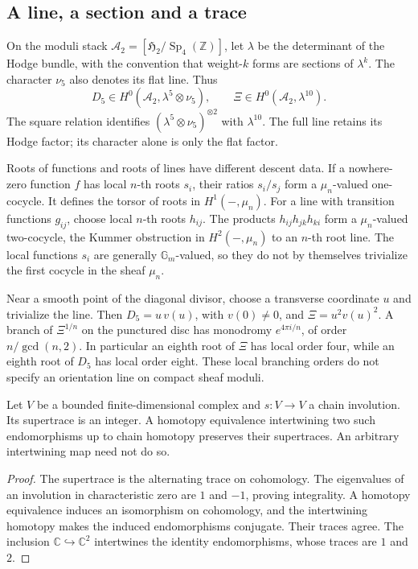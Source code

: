 \subsection{A line, a section and a trace}

On the moduli stack
\(\mathcal A_2=[\mathfrak H_2/\operatorname{Sp}_4(\mathbb Z)]\),
let \(\lambda\) be the determinant of the Hodge bundle,
with the convention that weight-\(k\) forms are sections
of \(\lambda^k\). The character \(\nu_5\) also denotes
its flat line. Thus
\begin{equation}\label{cyidx:eq:automorphic-line}
 D_5\in H^0(\mathcal A_2,\lambda^5\otimes\nu_5),
 \qquad
 \Xi\in H^0(\mathcal A_2,\lambda^{10}).
\end{equation}
The square relation identifies
\((\lambda^5\otimes\nu_5)^{\otimes2}\) with
\(\lambda^{10}\). The full line retains its Hodge
factor; its character alone is only the flat factor.

Roots of functions and roots of lines have different
descent data. If a nowhere-zero function \(f\) has local
\(n\)-th roots \(s_i\), their ratios \(s_i/s_j\)
form a \(\mu_n\)-valued one-cocycle. It defines the
torsor of roots in \(H^1(-,\mu_n)\).
For a line with transition functions \(g_{ij}\),
choose local \(n\)-th roots \(h_{ij}\).
The products \(h_{ij}h_{jk}h_{ki}\) form a
\(\mu_n\)-valued two-cocycle, the Kummer obstruction
in \(H^2(-,\mu_n)\) to an \(n\)-th root line.
The local functions \(s_i\) are generally
\(\mathbb G_m\)-valued, so they do not by themselves
trivialize the first cocycle in the sheaf \(\mu_n\).

Near a smooth point of the diagonal divisor, choose
a transverse coordinate \(u\) and trivialize the line.
Then \(D_5=u\,v(u)\), with \(v(0)\ne0\), and
\(\Xi=u^2v(u)^2\). A branch of \(\Xi^{1/n}\)
on the punctured disc has monodromy \(e^{4\pi i/n}\),
of order \(n/\gcd(n,2)\). In particular an eighth
root of \(\Xi\) has local order four, while an
eighth root of \(D_5\) has local order eight.
These local branching orders do not specify an
orientation line on compact sheaf moduli.

\begin{proposition}\label{cyidx:prop:trace}
Let \(V\) be a bounded finite-dimensional complex and
\(s:V\to V\) a chain involution. Its supertrace is an
integer. A homotopy equivalence intertwining two such
endomorphisms up to chain homotopy preserves their
supertraces. An arbitrary intertwining map need not do so.
\end{proposition}
\begin{proof}
The supertrace is the alternating trace on cohomology.
The eigenvalues of an involution in characteristic zero
are \(1\) and \(-1\), proving integrality.
A homotopy equivalence induces an isomorphism on cohomology,
and the intertwining homotopy makes the induced
endomorphisms conjugate. Their traces agree.
The inclusion \(\mathbb C\hookrightarrow\mathbb C^2\)
intertwines the identity endomorphisms, whose traces
are \(1\) and \(2\).
\end{proof}

